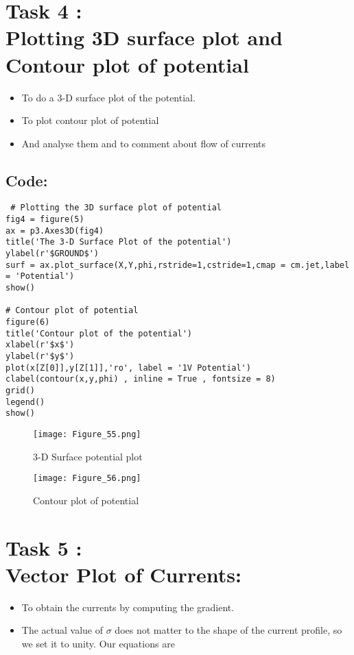 \documentclass[11pt, a4paper, twoside]{article}
\begin{document}
\section*{Task 4 :\\Plotting 3D surface plot and Contour plot of potential }
\begin{itemize}
\item
  To do a 3-D surface plot of the potential.
\item
  To plot contour plot of potential
\item
  And analyse them and to comment about flow of currents
\end{itemize}
\subsection*{Code:}

\begin{verbatim}
 # Plotting the 3D surface plot of potential
fig4 = figure(5) 
ax = p3.Axes3D(fig4)
title('The 3-D Surface Plot of the potential')
ylabel(r'$GROUND$')
surf = ax.plot_surface(X,Y,phi,rstride=1,cstride=1,cmap = cm.jet,label = 'Potential')
show()

# Contour plot of potential
figure(6)
title('Contour plot of the potential') 
xlabel(r'$x$')
ylabel(r'$y$')
plot(x[Z[0]],y[Z[1]],'ro', label = '1V Potential')
clabel(contour(x,y,phi) , inline = True , fontsize = 8)
grid()
legend()
show()
\end{verbatim}

\begin{figure}[!tbh]
 \centering
 \texttt{[image: Figure\_55.png]}  
 \caption{3-D Surface potential plot }
\end{figure}
\newpage

\begin{figure}[!tbh]
 \centering
 \texttt{[image: Figure\_56.png]}  
 \caption{ Contour plot of potential}
\end{figure}
\newpage


\section*{Task 5 :\\Vector Plot of Currents:}
\begin{itemize}
\item
  To obtain the currents by computing the gradient.
\item
  The actual value of \(\sigma\) does not matter to the shape of the
  current profile, so we set it to unity. Our equations are
\end{itemize}
\end{document}
